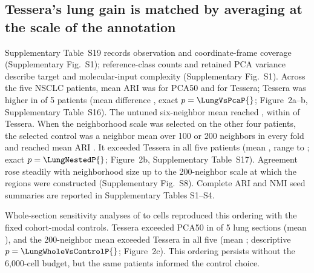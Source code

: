 \documentclass[11pt]{article}
\begin{document}
\subsection{Tessera's lung gain is matched by averaging at the scale of the annotation}
Supplementary Table~S19 records observation and coordinate-frame coverage (Supplementary Fig.~S1); reference-class counts and retained PCA variance describe target and molecular-input complexity (Supplementary Fig.~S1). Across the five NSCLC patients, mean ARI was \NsclcPca{} for PCA50 and \NsclcFull{} for Tessera; Tessera was higher in \LungVsPcaPositive{} of 5 patients (mean difference \NsclcDelta{}, exact \(p=\LungVsPcaP{}\); Figure~2a--b, Supplementary Table~S16). The untuned six-neighbor mean reached \NsclcMean{}, within \NsclcVsMean{} of Tessera. When the neighborhood scale was selected on the other four patients, the selected control was a neighbor mean over 100 or 200 neighbors in every fold and reached mean ARI \LungNestedControlMean{}. It exceeded Tessera in all five patients (mean \LungNestedDelta{}, range \LungNestedMin{} to \LungNestedMax{}; exact \(p=\LungNestedP{}\); Figure~2b, Supplementary Table~S17). Agreement rose steadily with neighborhood size up to the 200-neighbor scale at which the regions were constructed (Supplementary Fig.~S8). Complete ARI and NMI seed summaries are reported in Supplementary Tables S1--S4.

Whole-section sensitivity analyses of \WholeCellsMin{} to \WholeCellsMax{} cells reproduced this ordering with the fixed cohort-modal controls. Tessera exceeded PCA50 in \LungWholeVsPcaPositive{} of 5 lung sections (mean \LungWholeVsPcaMean{}), and the 200-neighbor mean exceeded Tessera in all five (mean \LungWholeVsControlMean{}; descriptive \(p=\LungWholeVsControlP{}\); Figure~2c). This ordering persists without the 6,000-cell budget, but the same patients informed the control choice.
\end{document}
